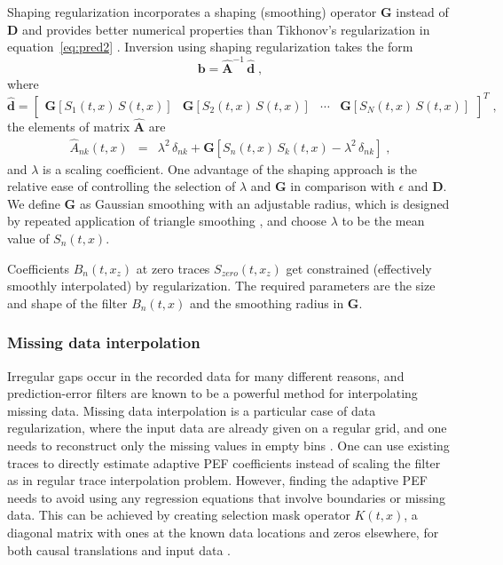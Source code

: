 Shaping regularization \cite[]{Fomel07} incorporates a shaping
(smoothing) operator $\mathbf{G}$ instead of $\mathbf{D}$ and
provides better numerical properties than Tikhonov's
regularization \cite[]{Tikhonov63} in
equation~\ref{eq:pred2} \cite[]{Fomel09}.
Inversion using shaping regularization takes the form
\begin{equation}
  \label{eq:rinv}
  \mathbf{b} = \widehat{\mathbf{A}}^{-1}\,\widehat{\mathbf{d}}\;,
\end{equation}
where 
\begin{equation}
  \label{eq:dvar}
\widehat{\mathbf{d}} = \left[\begin{array}{cccc}\mathbf{G}\left[S_1(t,x)\,S(t,x)\right] & 
\mathbf{G}\left[S_2(t,x)\,S(t,x)\right] & \cdots & 
\mathbf{G}\left[S_N(t,x)\,S(t,x)\right]\end{array}\right]^T\;,
\end{equation}
the elements of matrix $\widehat{\mathbf{A}}$ are
\begin{eqnarray}
  \label{eq:raij}
  \widehat{A}_{nk}(t,x) &=& \lambda^2\,\delta_{nk} + \mathbf{G}\left[S_n(t,x)\,S_k(t,x) - 
    \lambda^2\,\delta_{nk}\right]\;,
\end{eqnarray}
and $\lambda$ is a scaling coefficient. One advantage of the shaping
approach is the relative ease of controlling the selection of
$\lambda$ and $\mathbf{G}$ in comparison with $\epsilon$ and
$\mathbf{D}$. We define $\mathbf{G}$ as Gaussian smoothing with an
adjustable radius, which is designed by repeated application of
triangle smoothing \cite[]{Fomel07}, and choose $\lambda$ to be the
mean value of $S_n(t,x)$.

Coefficients $B_n(t,x_z)$ at zero traces $S_{zero}(t,x_z)$ get constrained
(effectively smoothly interpolated) by regularization. The required
parameters are the size and shape of the filter $B_n(t,x)$ and the
smoothing radius in $\mathbf{G}$.

\subsubsection{Missing data interpolation} 

Irregular gaps occur in the recorded data for many different reasons,
and prediction-error filters are known to be a powerful method for
interpolating missing data. Missing data interpolation is a particular
case of data regularization, where the input data are already given on
a regular grid, and one needs to reconstruct only the missing values
in empty bins \cite[]{Fomel01a}. One can use existing traces to
directly estimate adaptive PEF coefficients instead of scaling the
filter as in regular trace interpolation problem. However, finding the
adaptive PEF needs to avoid using any regression equations that
involve boundaries or missing data. This can be achieved by creating
selection mask operator $K(t,x)$, a diagonal matrix with ones at the
known data locations and zeros elsewhere, for both causal translations
and input data \cite[]{Claerbout10}.

